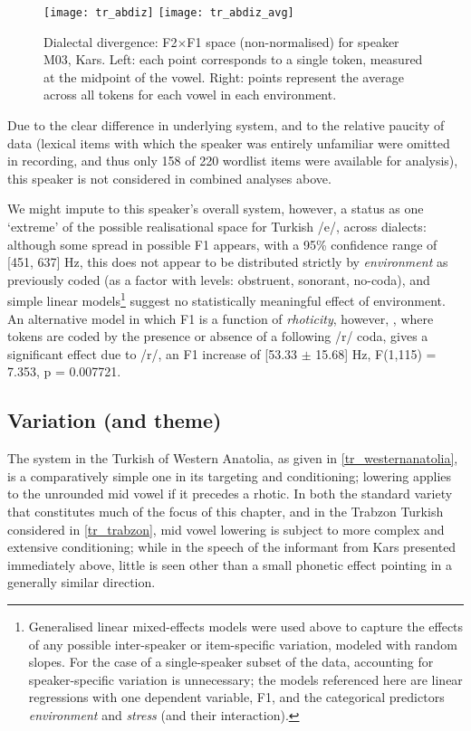 \begin{figure}[H]
  \centering
  \texttt{[image: tr\_abdiz]}
    \texttt{[image: tr\_abdiz\_avg]}
  \caption[Dialectal divergence: F2$\times$F1 space (non-normalised) for speaker M03, Kars.]{Dialectal divergence: F2$\times$F1 space (non-normalised) for speaker M03, Kars. Left: each point corresponds to a single token, measured at the midpoint of the vowel. Right: points represent the average across all tokens for each vowel in each environment.}
  \label{fig:abdiz}
\end{figure}

Due to the clear difference in underlying system, and to the relative paucity of data (lexical items with which the speaker was entirely unfamiliar were omitted in recording, and thus only 158 of 220 wordlist items were available for analysis), this speaker is not considered in combined analyses above.

We might impute to this speaker's overall system, however, a status as one `extreme' of the possible realisational space for Turkish /e/, across dialects: although some spread in possible F1 appears, with a 95\% confidence range of [451, 637] Hz, this does not appear to be distributed strictly by \emph{environment} as previously coded (as a factor with levels: obstruent, sonorant, no-coda), and simple linear models\footnote{Generalised linear mixed-effects models were used above to capture the effects of any possible inter-speaker or item-specific variation, modeled with random slopes. For the case of a single-speaker subset of the data, accounting for speaker-specific variation is unnecessary; the models referenced here are linear regressions with one dependent variable, F1, and the categorical predictors \emph{environment} and \emph{stress} (and their interaction).} suggest no statistically meaningful effect of environment. An alternative model in which F1 is a function of \emph{rhoticity}, however, , where tokens are coded by the presence or absence of a following /r/ coda, gives a significant effect due to /r/, an F1 increase of [53.33 $\pm$ 15.68] Hz, F(1,115) = 7.353, p = 0.007721.

\subsection{Variation (and theme)}\label{ss:trvariation}

The system in the Turkish of Western Anatolia, as given in \cref{tr_westernanatolia}, is a comparatively simple one in its targeting and conditioning; lowering applies to the unrounded mid vowel if it precedes a rhotic. In both the standard variety that constitutes much of the focus of this chapter, and in the Trabzon Turkish considered in \cref{tr_trabzon}, mid vowel lowering is subject to more complex and extensive conditioning; while in the speech of the informant from Kars presented immediately above, little is seen other than a small phonetic effect pointing in a generally similar direction.

